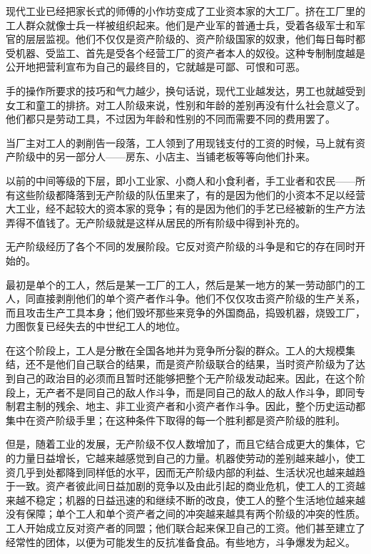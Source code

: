     现代工业已经把家长式的师傅的小作坊变成了工业资本家的大工厂。挤在工厂里的工人群众就像士兵一样被组织起来。他们是产业军的普通士兵，受着各级军士和军官的层层监视。他们不仅仅是资产阶级的、资产阶级国家的奴隶，他们每日每时都受机器、受监工、首先是受各个经营工厂的资产者本人的奴役。这种专制制度越是公开地把营利宣布为自己的最终目的，它就越是可鄙、可恨和可恶。

    手的操作所要求的技巧和气力越少，换句话说，现代工业越发达，男工也就越受到女工和童工的排挤。对工人阶级来说，性别和年龄的差别再没有什么社会意义了。他们都只是劳动工具，不过因为年龄和性别的不同而需要不同的费用罢了。

    当厂主对工人的剥削告一段落，工人领到了用现钱支付的工资的时候，马上就有资产阶级中的另一部分人——房东、小店主、当铺老板等等向他们扑来。

    以前的中间等级的下层，即小工业家、小商人和小食利者，手工业者和农民——所有这些阶级都降落到无产阶级的队伍里来了，有的是因为他们的小资本不足以经营大工业，经不起较大的资本家的竞争；有的是因为他们的手艺已经被新的生产方法弄得不值钱了。无产阶级就是这样从居民的所有阶级中得到补充的。

    无产阶级经历了各个不同的发展阶段。它反对资产阶级的斗争是和它的存在同时开始的。

    最初是单个的工人，然后是某一工厂的工人，然后是某一地方的某一劳动部门的工人，同直接剥削他们的单个资产者作斗争。他们不仅仅攻击资产阶级的生产关系，而且攻击生产工具本身；他们毁坏那些来竞争的外国商品，捣毁机器，烧毁工厂，力图恢复已经失去的中世纪工人的地位。

    在这个阶段上，工人是分散在全国各地并为竞争所分裂的群众。工人的大规模集结，还不是他们自己联合的结果，而是资产阶级联合的结果，当时资产阶级为了达到自己的政治目的必须而且暂时还能够把整个无产阶级发动起来。因此，在这个阶段上，无产者不是同自己的敌人作斗争，而是同自己的敌人的敌人作斗争，即同专制君主制的残余、地主、非工业资产者和小资产者作斗争。因此，整个历史运动都集中在资产阶级手里；在这种条件下取得的每一个胜利都是资产阶级的胜利。

    但是，随着工业的发展，无产阶级不仅人数增加了，而且它结合成更大的集体，它的力量日益增长，它越来越感觉到自己的力量。机器使劳动的差别越来越小，使工资几乎到处都降到同样低的水平，因而无产阶级内部的利益、生活状况也越来越趋于一致。资产者彼此间日益加剧的竞争以及由此引起的商业危机，使工人的工资越来越不稳定；机器的日益迅速的和继续不断的改良，使工人的整个生活地位越来越没有保障；单个工人和单个资产者之间的冲突越来越具有两个阶级的冲突的性质。工人开始成立反对资产者的同盟；他们联合起来保卫自己的工资。他们甚至建立了经常性的团体，以便为可能发生的反抗准备食品。有些地方，斗争爆发为起义。

